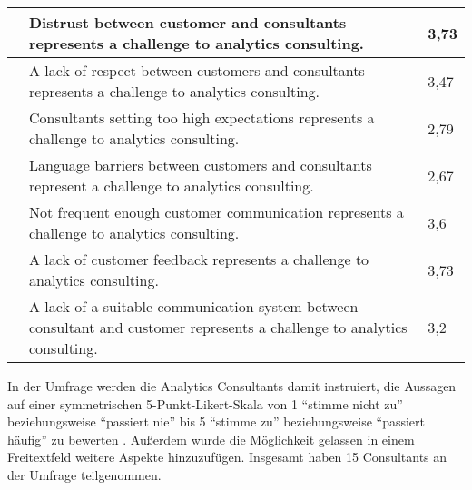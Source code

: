 \documentclass[../main.tex]{subfiles}
\begin{document}
\begin{dontcount}
\begin{xltabular}[h]{\linewidth}{| N X | m{2.2cm}|}
        \hline
        \label{q:9}&\hspace{-0.8em}Distrust between customer and consultants represents a challenge to analytics consulting. & 3,73  \\
        \hline
        \label{q:10}&\hspace{-0.8em}A lack of respect between customers and consultants represents a challenge to analytics consulting. & 3,47  \\
        \hline
        \label{q:11}&\hspace{-0.8em}Consultants setting too high expectations represents a challenge to analytics consulting. & 2,79  \\
        \hline
        \label{q:12}&\hspace{-0.8em}Language barriers between customers and consultants represent a challenge to analytics consulting. & 2,67  \\
        \hline
        \label{q:13}&\hspace{-0.8em}Not frequent enough customer communication represents a challenge to analytics consulting. & 3,6  \\
        \hline
        \label{q:14}&\hspace{-0.8em}A lack of customer feedback represents a challenge to analytics consulting. & 3,73  \\
        \hline
        \label{q:15}&\hspace{-0.8em}A lack of a suitable communication system between consultant and customer represents a challenge to analytics consulting. & 3,2  \\
        \hline
    \end{xltabular}
\end{dontcount}

In der Umfrage werden die Analytics Consultants damit instruiert, die Aussagen auf einer symmetrischen 5-Punkt-Likert-Skala von 1 ``stimme nicht zu'' beziehungsweise ``passiert nie'' bis 5 ``stimme zu'' beziehungsweise ``passiert häufig'' zu bewerten \autocite{joshi2015likert}.
Außerdem wurde die Möglichkeit gelassen in einem Freitextfeld weitere Aspekte hinzuzufügen.
Insgesamt haben 15 Consultants an der Umfrage teilgenommen.
\end{document}
